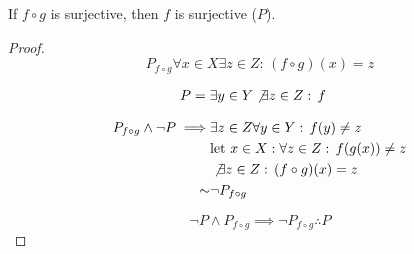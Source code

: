 \begin{question}
	If $f\circ g$ is surjective, then $f$ is surjective ($P$).

	\begin{proof}

		$$ P_{f\circ g}	\forall x \in X \exists z \in Z : \, (f\circ g)(x) = z $$

		\begin{align*}
			P & = \exists y \in Y \not\exists z \in Z : \, f
		\end{align*}

		\begin{align*}
			P_{f\circ g}\wedge		\neg P   \implies & \exists z \in Z  \forall y \in Y :\, f(y) \neq z     \\
			                                      & {\text{let } } x   \in X : \forall z \in Z :\, f(g(x)) \neq z \\
			                                      & \not\exists z \in Z :\, (f\circ g)(x) = z            \\
			\sim                                  & \neg P_{f\circ g}
		\end{align*}

		$$ \neg P \wedge P_{f\circ g} \implies \neg P_{f\circ g} \therefore P $$

	\end{proof}
\end{question}
